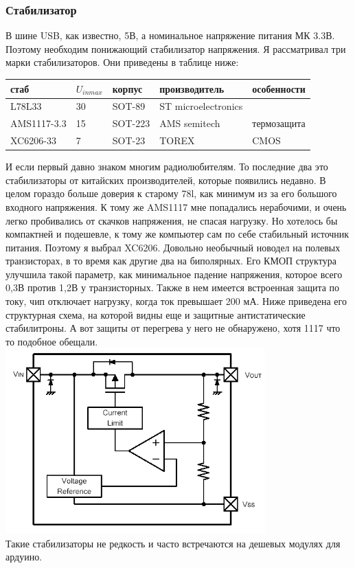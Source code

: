 \documentclass[12pt,a4paper]{article}
\begin{document}
\subsubsection{Стабилизатор}
    В шине USB, как известно, 5В, а номинальное напряжение питания МК 3.3В.
    Поэтому необходим понижающий стабилизатор напряжения. Я рассматривал три
    марки стабилизаторов. Они приведены в таблице ниже:
\begin{center}
  \begin{tabular}{ | l | l | l | l | l | }
    \hline
    стаб & $U_{in max}$ & корпус & производитель & особенности \\ \hline
    L78L33 & 30 & SOT-89 & ST microelectronics &  \\ \hline
    AMS1117-3.3 & 15 & SOT-223 & AMS semitech & термозащита \\ \hline
    XC6206-33 & 7 & SOT-23 & TOREX & CMOS \\ \hline
     \end{tabular}
\end{center}
    И если первый давно знаком многим радиолюбителям. То последние два это
    стабилизаторы от китайских производителей, которые появились недавно.
    В целом гораздо больше доверия к старому 78l, как минимум из за его
    большого входного напряжения. К тому же AMS1117 мне
    попадались нерабочими, и очень легко пробивались от скачков напряжения,
    не спасая нагрузку. Но хотелось бы компактней и подешевле, к тому же
    компьютер сам по себе стабильный источник питания. Поэтому я выбрал XC6206.
    Довольно необычный новодел на полевых транзисторах, в то время как другие
    два на биполярных. Его КМОП структура
    улучшила такой параметр, как минимальное падение напряжения, которое
    всего 0,3В против 1,2В у транзисторных. Также в нем имеется встроенная
    защита по току, чип отключает нагрузку, когда ток превышает 200 мА.
    Ниже приведена его структурная схема, на которой видны
    еще и защитные антистатические стабилитроны. А вот защиты от перегрева у
    него не обнаружено, хотя 1117 что то подобное обещали.\\
\includegraphics[width=10cm]{6206.png}\\
    Такие стабилизаторы не редкость и часто встречаются на дешевых модулях
    для ардуино.
\end{document}
